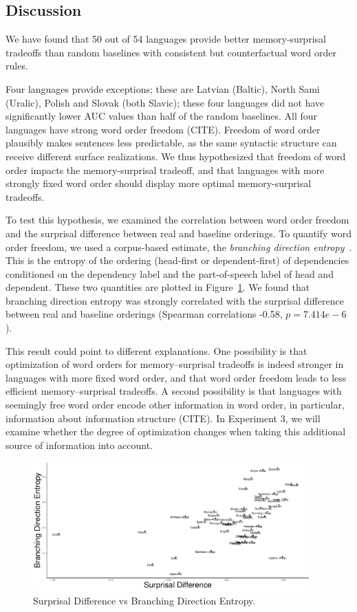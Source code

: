 \subsection{Discussion}

We have found that 50 out of 54 languages provide better memory-surprisal tradeoffs than random baselines with consistent but counterfactual word order rules.

Four languages provide exceptions; these are Latvian (Baltic), North Sami (Uralic), Polish and Slovak (both Slavic); these four languages did not have significantly lower AUC values than half of the random baselines.
All four languages have strong word order freedom (CITE).
Freedom of word order plausibly makes sentences less predictable, as the same syntactic structure can receive different surface realizations.
We thus hypothesized that freedom of word order impacts the memory-surprisal tradeoff, and that languages with more strongly fixed word order should display more optimal memory-surprisal tradeoffs.

To test this hypothesis, we examined the correlation between word order freedom and the surprisal difference between real and baseline orderings.
To quantify word order freedom, we used a corpus-based estimate, the \emph{branching direction entropy}~\citep{futrell-quantifying-2015}.
This is the entropy of the ordering (head-first or dependent-first) of dependencies conditioned on the dependency label and the part-of-speech label of head and dependent.
These two quantities are plotted in Figure~\ref{fig:hist-real}.
We found that branching direction entropy was strongly correlated with the surprisal difference between real and baseline orderings (Spearman correlations -0.58, $p = 7.414e-6$).

This result could point to different explanations.
One possibility is that optimization of word orders for memory--surprisal tradeoffs is indeed stronger in languages with more fixed word order, and that word order freedom leads to less efficient memory--surprisal tradeoffs.
A second possibility is that languages with seemingly free word order encode other information in word order, in particular, information about information structure (CITE).
In Experiment 3, we will examine whether the degree of optimization changes when taking this additional source of information into account.



\begin{figure}
\includegraphics[width=0.95\textwidth]{figures/surprisal-branching-entropy-REAL.pdf}
	\caption{Surprisal Difference vs Branching Direction Entropy.}\label{fig:hist-real}
\end{figure}


